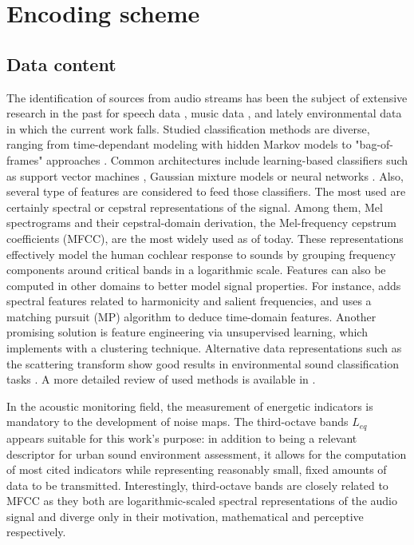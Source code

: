 \documentclass[sensors,article,submit,moreauthors,pdftex,10pt,a4paper]{mdpi}
\begin{document}
\section{Encoding scheme} \label{sec:coder}

\subsection{Data content}


The identification of sources from audio streams has been the subject of extensive research in the past for speech data \cite{anusuya2009}, music data \cite{tzanetakis2002}, and lately environmental data in which the current work falls. Studied classification methods are diverse, ranging from time-dependant modeling with hidden Markov models \cite{ntalampiras2014} to "bag-of-frames" approaches \cite{aucouturier2007, foggia2015}. Common architectures include learning-based classifiers such as support vector machines \cite{kumar2016}, Gaussian mixture models \cite{radhakrishnan2005} or neural networks \cite{salamon2017, piczak2015}. Also, several type of features are considered to feed those classifiers. The most used are certainly spectral \cite{khunarsal2013} or cepstral \cite{couvreur2004} representations of the signal. Among them, Mel spectrograms and their cepstral-domain derivation, the Mel-frequency cepstrum coefficients (MFCC), are the most widely used as of today. These representations effectively model the human cochlear response to sounds by grouping frequency components around critical bands in a logarithmic scale. Features can also be computed in other domains to better model signal properties. For instance, \cite{cai2006} adds spectral features related to harmonicity and salient frequencies, and \cite{chu2009} uses a matching pursuit (MP) algorithm to deduce time-domain features. Another promising solution is feature engineering via unsupervised learning, which \cite{salamon2015-2} implements with a clustering technique. Alternative data representations such as the scattering transform \cite{bauge2013} show good results in environmental sound classification tasks \cite{salamon2015}. A more detailed review of used methods is available in \cite{chachada2013}.

In the acoustic monitoring field, the measurement of energetic indicators is mandatory to the development of noise maps. The third-octave bands $L_{eq}$ appears suitable for this work's purpose: in addition to being a relevant descriptor \cite{torija2013} for urban sound environment assessment, it allows for the computation of most cited indicators while representing reasonably small, fixed amounts of data to be transmitted. Interestingly, third-octave bands are closely related to MFCC as they both are logarithmic-scaled spectral representations of the audio signal and diverge only in their motivation, mathematical and perceptive respectively.
\end{document}
